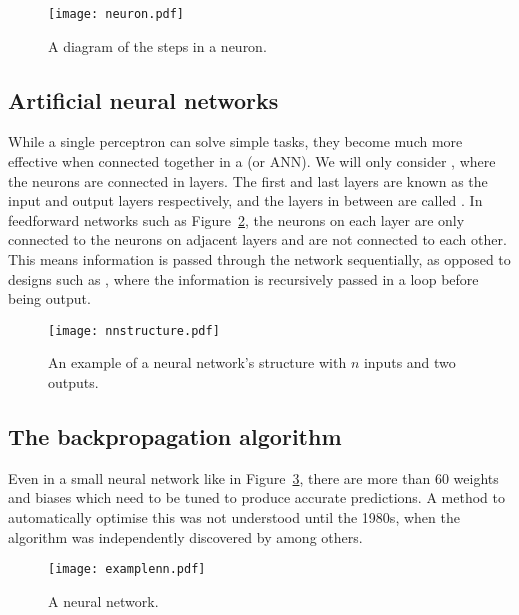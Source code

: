 \begin{figure}[htbp]
 \centering
 \texttt{[image: neuron.pdf]}
 \caption{A diagram of the steps in a neuron.}
 \label{neuron}
\end{figure}

\subsection{Artificial neural networks}

While a single perceptron can solve simple tasks, they become much more effective when connected together in a  (or \ac{ANN}).
We will only consider , where the neurons are connected in layers.
The first and last layers are known as the input and output layers respectively, and the layers in between are called .
In feedforward networks such as Figure~\ref{nnstructure}, the neurons on each layer are only connected to the neurons on adjacent layers and are not connected to each other.
This means information is passed through the network sequentially, as opposed to designs such as , where the information is recursively passed in a loop before being output.

\begin{figure}[htbp]
 \centering
 \texttt{[image: nnstructure.pdf]}
 \caption{An example of a neural network's structure with \(n\) inputs and two outputs.}
 \label{nnstructure}
\end{figure}

\subsection{The backpropagation algorithm}\label{backpropagation}

Even in a small neural network like in Figure~\ref{examplenn}, there are more than 60 weights and biases which need to be tuned to produce accurate predictions.
A method to automatically optimise this was not understood until the 1980s, when the  algorithm was independently discovered by \textcite{rumelhart1986a} among others.

\begin{figure}[htbp]
 \centering
 \texttt{[image: examplenn.pdf]}
 \caption{A neural network.}
 \label{examplenn}
\end{figure}

